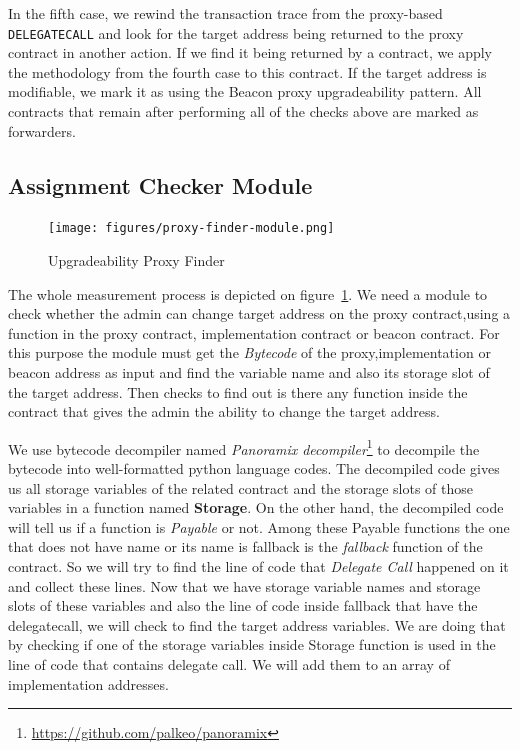 In the fifth case, we rewind the transaction trace from the proxy-based \texttt{DELEGATECALL} and look for the target address being returned to the proxy contract in another action. If we find it being returned by a contract, we apply the methodology from the fourth case to this contract. If the target address is modifiable, we mark it as using the Beacon proxy upgradeability pattern. All contracts that remain after performing all of the checks above are marked as forwarders. 


 \subsection{Assignment Checker Module}
\label{app:assignment}

\begin{figure}[t!]
 \texttt{[image: figures/proxy-finder-module.png]}
 \caption{Upgradeability Proxy Finder}
 \label{fig:finderModule}
\end{figure}

The whole measurement process is depicted on figure~\ref{fig:finderModule}. We need a module to check whether the admin can change target address on the proxy contract,using a function in the proxy contract, implementation contract or beacon contract. For this purpose the module must get the \textit{Bytecode} of the proxy,implementation or beacon address as input and find the variable name and also its storage slot of the target address. Then checks to find out is there any function inside the contract that gives the admin the ability to change the target address.

We use bytecode decompiler named \textit{Panoramix decompiler}\footnote{\url{https://github.com/palkeo/panoramix}} to decompile the bytecode into well-formatted python language codes. The decompiled code gives us all storage variables of the related contract and the storage slots of those variables in a function named \textbf{Storage}. On the other hand, the decompiled code will tell us if a function is \textit{Payable} or not. Among these Payable functions the one that does not have name or its name is fallback is the \textit{fallback} function of the contract. So we will try to find the line of code that \textit{Delegate Call} happened on it and collect these lines. Now that we have storage variable names and storage slots of these variables and also the line of code inside fallback that have the delegatecall, we will check to find the target address variables. We are doing that by checking if one of the storage variables inside Storage function is used in the line of code that contains delegate call. We will add them to an array of implementation addresses.

